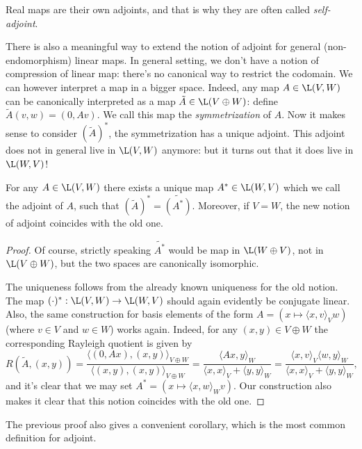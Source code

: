 Real maps are their own adjoints, and that is why they are often called \textit{self-adjoint}.

There is also a meaningful way to extend the notion of adjoint for general (non-endomorphism) linear maps. In general setting, we don't have a notion of compression of linear map: there's no canonical way to restrict the codomain. We can however interpret a map in a bigger space. Indeed, any map $A \in \L(V, W)$ can be canonically interpreted as a map $\tilde{A} \in \L(V \oplus W)$: define $\tilde{A}(v, w) = (0, A v)$. We call this map the \textit{symmetrization} of $A$. Now it makes sense to consider $(\tilde{A})^{*}$, the symmetrization has a unique adjoint. This adjoint does not in general live in $\L(V, W)$ anymore: but it turns out that it does live in $\L(W, V)$!

\begin{lause}
	For any $A \in \L(V, W)$ there exists a unique map $A^{*} \in \L(W, V)$ which we call the adjoint of $A$, such that $(\tilde{A})^{*} = \tilde{(A^{*})}$. Moreover, if $V = W$, the new notion of adjoint coincides with the old one.
\end{lause}

\begin{proof}
	Of course, strictly speaking $\tilde{A^{*}}$ would be map in $\L(W \oplus V)$, not in $\L(V \oplus W)$, but the two spaces are canonically isomorphic.

	The uniqueness follows from the already known uniqueness for the old notion. The map $(\cdot)^{*} : \L(V, W) \to \L(W, V)$ should again evidently be conjugate linear. Also, the same construction for basis elements of the form $A = (x \mapsto \langle x, v \rangle_{V} w)$ (where $v \in V$ and $w \in W$) works again. Indeed, for any $(x, y) \in V \oplus W$ the corresponding Rayleigh quotient is given by
	\[
		R(\tilde{A}, (x, y)) = \frac{\langle (0, A x), (x, y)\rangle_{V \oplus W} }{\langle (x, y), (x, y) \rangle_{V \oplus W}} = \frac{\langle A x, y\rangle_{W} }{\langle x, x \rangle_{V} + \langle y, y \rangle_{W}} = \frac{\langle x, v\rangle_{V} \langle w, y\rangle_{W} }{\langle x, x \rangle_{V} + \langle y, y \rangle_{W}},
	\]
	and it's clear that we may set $A^{*} = (x \mapsto \langle x, w \rangle_{W} v)$. Our construction also makes it clear that this notion coincides with the old one.
\end{proof}

The previous proof also gives a convenient corollary, which is the most common definition for adjoint.

